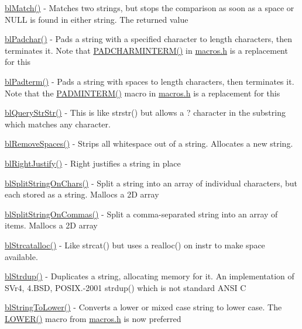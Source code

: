 \begin{DoxyItemize}
\item \hyperlink{parse_8c_af4d52eae06ff069484ebd98143722134}{bl\-Match()} -\/ Matches two strings, but stops the comparison as soon as a space or N\-U\-L\-L is found in either string. The returned value
\item \hyperlink{general_8h_a3d51946e1ce17558766a0984c5d77914}{bl\-Padchar()} -\/ Pads a string with a specified character to length characters, then terminates it. Note that \hyperlink{macros_8h_ae40c354ba544d11cc47fe6cc74b4e966}{P\-A\-D\-C\-H\-A\-R\-M\-I\-N\-T\-E\-R\-M()} in \hyperlink{macros_8h}{macros.\-h} is a replacement for this
\item \hyperlink{general_8h_af3e38629eb9182b36af7bf960d3758d8}{bl\-Padterm()} -\/ Pads a string with spaces to length characters, then terminates it. Note that the \hyperlink{macros_8h_a8db1217a164f5997e33c5fa121f93ccf}{P\-A\-D\-M\-I\-N\-T\-E\-R\-M()} macro in \hyperlink{macros_8h}{macros.\-h} is a replacement for this
\item \hyperlink{general_8h_acdc27ff9b62a98ded5d9c714f0e444e7}{bl\-Query\-Str\-Str()} -\/ This is like strstr() but allows a ? character in the substring which matches any character.
\item \hyperlink{general_8h_adfc7bbb71e472cb8edba7bbcd0f3e772}{bl\-Remove\-Spaces()} -\/ Strips all whitespace out of a string. Allocates a new string.
\item \hyperlink{general_8h_ad1ba646ac012e961c10d1fe26cd4cce7}{bl\-Right\-Justify()} -\/ Right justifies a string in place
\item \hyperlink{general_8h_a62e1ec6a65252619dd1060bdd68bc7a5}{bl\-Split\-String\-On\-Chars()} -\/ Split a string into an array of individual characters, but each stored as a string. Mallocs a 2\-D array
\item \hyperlink{general_8h_a78bedd3b9e96196fe6eb9fe9bcd1e19b}{bl\-Split\-String\-On\-Commas()} -\/ Split a comma-\/separated string into an array of items. Mallocs a 2\-D array
\item \hyperlink{general_8h_afcb923c739bf3a71e89e724e42a23af3}{bl\-Strcatalloc()} -\/ Like strcat() but uses a realloc() on instr to make space available.
\item \hyperlink{hash_8h_aa78d7f1c3e3e9c611b6ebf61475ed358}{bl\-Strdup()} -\/ Duplicates a string, allocating memory for it. An implementation of S\-Vr4, 4.\-B\-S\-D, P\-O\-S\-I\-X.-\/2001 strdup() which is not standard A\-N\-S\-I C
\item \hyperlink{general_8h_a4ba273766cb8e3f5b32eaa226c3e0fc7}{bl\-String\-To\-Lower()} -\/ Converts a lower or mixed case string to lower case. The \hyperlink{macros_8h_a7c84c2a411c6ca224eb95a0e9438e9ca}{L\-O\-W\-E\-R()} macro from \hyperlink{macros_8h}{macros.\-h} is now preferred

\end{DoxyItemize}
